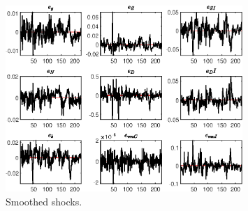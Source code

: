  
\begin{figure}[H]
\centering 
\includegraphics[width=0.80\textwidth]{BRS_sectoral_wo_fixed_cost/graphs/BRS_sectoral_wo_fixed_cost_SmoothedShocks1}
\caption{Smoothed shocks.}\label{Fig:SmoothedShocks:1}
\end{figure}


